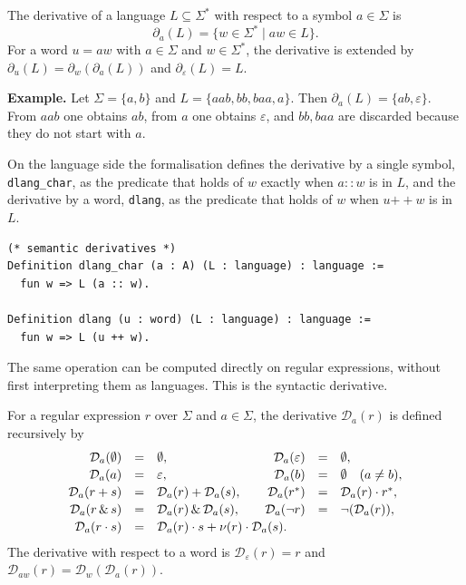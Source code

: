 \begin{definition}\label{def:derivative}
The derivative of a language $L \subseteq \Sigma^*$ with respect to a symbol
$a \in \Sigma$ is
\[
  \partial_a(L)=\{ w \in \Sigma^* \mid a w \in L \}.
\]
For a word $u=a w$ with $a\in\Sigma$ and $w\in\Sigma^{*}$, the derivative is
extended by $\partial_{u}(L)=\partial_{w}(\partial_{a}(L))$ and
$\partial_{\varepsilon}(L)=L$.
\end{definition}

\noindent\textbf{Example.} Let $\Sigma=\{a,b\}$ and $L=\{aab,bb,baa,a\}$. Then
$\partial_a(L)=\{ab,\varepsilon\}$. From $aab$ one obtains $ab$, from $a$ one obtains
$\varepsilon$, and $bb,baa$ are discarded because they do not start with $a$.

\medskip
On the language side the formalisation defines the derivative by a single symbol,
\texttt{dlang\_char}, as the predicate that holds of $w$ exactly when $a :: w$ is in
$L$, and the derivative by a word, \texttt{dlang}, as the predicate that holds of
$w$ when $u \mathbin{+\!\!+} w$ is in $L$.

\begin{lstlisting}[style=rocqstyle,caption={Semantic (language) derivatives (\texttt{Derivatives.v}).},label={lst:dlang}]
(* semantic derivatives *)
Definition dlang_char (a : A) (L : language) : language :=
  fun w => L (a :: w).

Definition dlang (u : word) (L : language) : language :=
  fun w => L (u ++ w).
\end{lstlisting}

The same operation can be computed directly on regular expressions, without first
interpreting them as languages. This is the syntactic derivative.

\begin{definition}\label{def:regex-symbol-derivative}
For a regular expression $r$ over $\Sigma$ and $a\in\Sigma$, the derivative
$\mathcal{D}_a(r)$ is defined recursively by
\[
\begin{array}{rcl@{\qquad}rcl}
    \mathcal{D}_a(\emptyset) &=& \emptyset, &
    \mathcal{D}_a(\varepsilon) &=& \emptyset,\\[0.4ex]
    \mathcal{D}_a(a) &=& \varepsilon, &
    \mathcal{D}_a(b) &=& \emptyset \quad (a\neq b),\\[0.4ex]
    \mathcal{D}_a(r+s) &=& \mathcal{D}_a(r)+\mathcal{D}_a(s), &
    \mathcal{D}_a(r^*) &=& \mathcal{D}_a(r)\cdot r^*,\\[0.4ex]
    \mathcal{D}_a(r\,\&\,s) &=& \mathcal{D}_a(r)\,\&\,\mathcal{D}_a(s), &
    \mathcal{D}_a(\neg r) &=& \neg(\mathcal{D}_a(r)),\\[0.4ex]
    \mathcal{D}_a(r\cdot s) &=& \multicolumn{4}{l}{\mathcal{D}_a(r)\cdot s + \nu(r)\cdot \mathcal{D}_a(s).}
\end{array}
\]
The derivative with respect to a word is $\mathcal{D}_\varepsilon(r)=r$ and
$\mathcal{D}_{aw}(r)=\mathcal{D}_w(\mathcal{D}_a(r))$.
\end{definition}


